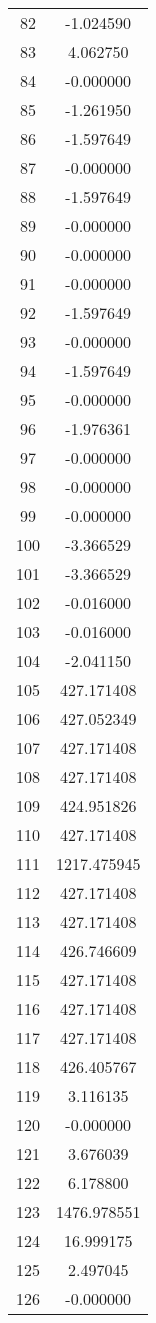 \documentclass[12pt]{article}
\begin{document}
\begin{longtable}{@{}cc@{}}
82 & -1.024590 \\
83 & 4.062750 \\
84 & -0.000000 \\
85 & -1.261950 \\
86 & -1.597649 \\
87 & -0.000000 \\
88 & -1.597649 \\
89 & -0.000000 \\
90 & -0.000000 \\
91 & -0.000000 \\
92 & -1.597649 \\
93 & -0.000000 \\
94 & -1.597649 \\
95 & -0.000000 \\
96 & -1.976361 \\
97 & -0.000000 \\
98 & -0.000000 \\
99 & -0.000000 \\
100 & -3.366529 \\
101 & -3.366529 \\
102 & -0.016000 \\
103 & -0.016000 \\
104 & -2.041150 \\
105 & 427.171408 \\
106 & 427.052349 \\
107 & 427.171408 \\
108 & 427.171408 \\
109 & 424.951826 \\
110 & 427.171408 \\
111 & 1217.475945 \\
112 & 427.171408 \\
113 & 427.171408 \\
114 & 426.746609 \\
115 & 427.171408 \\
116 & 427.171408 \\
117 & 427.171408 \\
118 & 426.405767 \\
119 & 3.116135 \\
120 & -0.000000 \\
121 & 3.676039 \\
122 & 6.178800 \\
123 & 1476.978551 \\
124 & 16.999175 \\
125 & 2.497045 \\
126 & -0.000000 \\

\end{longtable}
\end{document}
